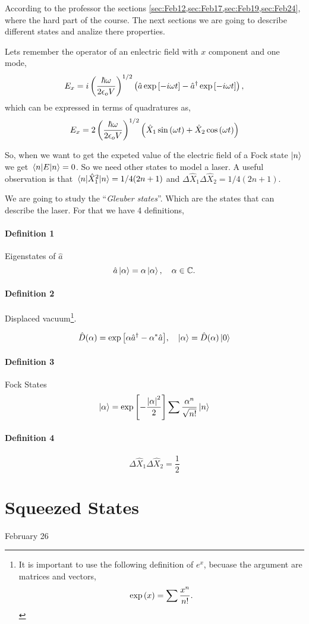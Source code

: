\documentclass[a4paper]{tufte-handout} %
\newcommand{\hata}{\hat{a}}
\newcommand{\hatad}{\hat{a}^\dagger}
\newcommand{\QDi}{\hat{X}_1}
\newcommand{\QDj}{\hat{X}_2}
\begin{document}
According to the professor the sections \ref{sec:Feb12,sec:Feb17,sec:Feb19,sec:Feb24}, where the hard part of the course.
The next sections we are going to describe different states and analize there properties.

Lets remember the operator of an enlectric field with $x$ component and one mode,
\begin{gather*}
    E_x = i\left(\frac{\hbar\omega}{2\epsilon_o V}\right)^{1/2}\left(\hata\exp\qty[-i\omega t] - \hatad\exp\qty[-i\omega t]\right),
\end{gather*}
which can be expressed in terms of quadratures as,
\begin{gather*}
    E_x = 2\left(\frac{\hbar\omega}{2\epsilon_o V}\right)^{1/2}\qty( \hat{X}_1\sin\qty(\omega t) +  \hat{X}_2\cos\qty(\omega t))
\end{gather*}

So, when we want to get the expeted value of the electric field of a Fock state $\ket{n}$ we get $\expval{E}{n}=0$.
So we need other states to model a laser.
A useful observation is that $\expval{\QDi^2}{n}=1/4(2n+1)$ and $\Delta\QDi\Delta\QDj=1/4(2n+1)$.

We are going to study the ``\textit{Gleuber states}''.
Which are the states that can describe the laser.
For that we have 4 definitions,
\paragraph{Definition 1}
Eigenstates of $\hata$ \[\hata\ket{\alpha}=\alpha\ket{\alpha},\quad\alpha\in\mathbb{C}.\]

\paragraph{Definition 2}
Displaced vacuum\footnote{
    It is important to use the following definition of $e^x$, becuase the argument are matrices and vectors,
\[\exp\qty(x)=\sum\frac{x^n}{n!}.\]
}.

\begin{gather*}
    \hat{D}\qty(\alpha) = \exp\qty[\alpha\hatad-\alpha^*\hata],\quad\ket{\alpha}=\hat{D}(\alpha)\ket{0}
\end{gather*}

\paragraph{Definition 3}
Fock States
\begin{gather*}
    \ket{\alpha} = \exp\qty[-\frac{\abs{\alpha}^2}{2}]\sum\frac{\alpha^n}{\sqrt{n!}}\ket{n}
\end{gather*}

\paragraph{Definition 4}
\[\Delta\QDi\Delta\QDj=\frac{1}{2}\]

\section{Squeezed States}
February 26
\end{document}
